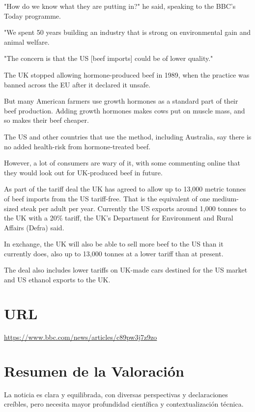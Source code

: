 \documentclass[10pt,a4paper]{article}
\begin{document}
"How do we know what they are putting in?" he said, speaking to the BBC's Today programme.
\par\medskip
"We spent 50 years building an industry that is strong on environmental gain and animal welfare.
\par\medskip
"The concern is that the US [beef imports] could be of lower quality."
\par\medskip
The UK stopped allowing hormone-produced beef in 1989, when the practice was banned across the EU after it declared it unsafe.
\par\medskip
But many American farmers use growth hormones as a standard part of their beef production. Adding growth hormones makes cows put on muscle mass, and so makes their beef cheaper.
\par\medskip
The US and other countries that use the method, including Australia, say there is no added health-risk from hormone-treated beef.
\par\medskip
However, a lot of consumers are wary of it, with some commenting online that they would look out for UK-produced beef in future.
\par\medskip
As part of the tariff deal the UK has agreed to allow up to 13,000 metric tonnes of beef imports from the US tariff-free. That is the equivalent of one medium-sized steak per adult per year. Currently the US exports around 1,000 tonnes to the UK with a 20\% tariff, the UK's Department for Environment and Rural Affairs (Defra) said.
\par\medskip
In exchange, the UK will also be able to sell more beef to the US than it currently does, also up to 13,000 tonnes at a lower tariff than at present.
\par\medskip
The deal also includes lower tariffs on UK-made cars destined for the US market and US ethanol exports to the UK.
\vspace{1em}

\section*{URL}
\url{ https://www.bbc.com/news/articles/c89pw3j7z9zo }
\vspace{1em}

\section*{Resumen de la Valoración}
    La noticia es clara y equilibrada, con diversas perspectivas y declaraciones cre\'{i}bles, pero necesita mayor profundidad cient\'{i}fica y contextualizaci\'{o}n t\'{e}cnica.
\vspace{1em}
\end{document}
